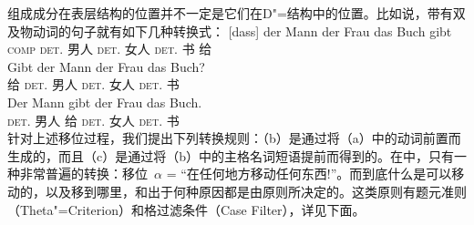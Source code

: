 组成成分在表层结构的位置并不一定是它们在D"=结构中的位置。比如说，带有双及物动词的句子就有如下几种转换式：
\eal
\ex 
\gll {}[dass] der Mann der Frau das Buch gibt\\
	 {}\spacebr{}\textsc{comp} \textsc{det}.\nom{}  男人 \textsc{det}.\dat{} 女人 \textsc{det}.\acc{} 书 给\\
\ex 
\gll Gibt der Mann der Frau das Buch?\\
	 给 \textsc{det}.\nom{} 男人 \textsc{det}.\dat{} 女人 \textsc{det}.\acc{} 书\\
\ex 
\gll Der Mann gibt der Frau das Buch.\\
	 \textsc{det}.\nom{} 男人 给 \textsc{det}.\dat{} 女人 \textsc{det}.\acc{} 书\\
\zl
针对上述移位过程，我们提出下列转换规则：（b）是通过将（a）中的动词前置而生成的，而且（c）是通过将（b）中的主格名词短语提前而得到的。在\gbtc 中，只有一种非常普遍的转换：移位~$\alpha$ = “在任何地方移动任何东西!”。而到底什么是可以移动的，以及移到哪里，和出于何种原因都是由原则所决定的。这类原则有题元准则（Theta"=Criterion）和格过滤条件（Case Filter），详见下面。

